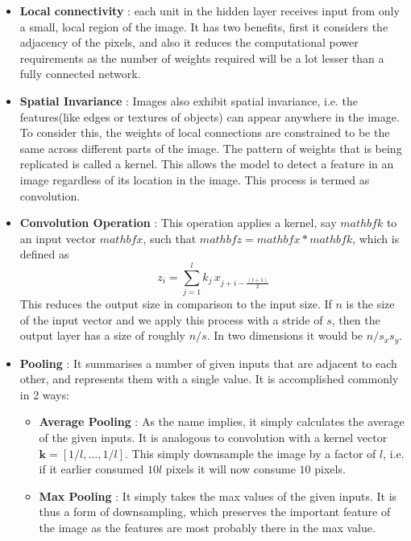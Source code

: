 \documentclass{article}
\begin{document}
  \begin{itemize}
    \item \textbf{Local connectivity} : each unit in the hidden layer receives input from only a small, local region of the image. It has two benefits, first it considers the adjacency of the pixels, and also it reduces the computational power requirements as the number of weights required will be a lot lesser than a fully connected network.
    \item \textbf{Spatial Invariance} : Images also exhibit spatial invariance, i.e. the features(like edges or textures of objects) can appear anywhere in the image. To consider this, the weights of local connections are constrained to be the same across different parts of the image. The pattern of weights that is being replicated is called a kernel. This allows the model to detect a feature in an image regardless of its location in the image. This process is termed as convolution.
    \item \textbf{Convolution Operation} : This operation applies a kernel, say $mathbf{k}$ to an input  vector $mathbf{x}$, such that $mathbf{z } =mathbf{x} * mathbf{k}$, which is defined as
      \begin{equation*}
        z_i = \sum_{j=1}^{l} k_j \, x_{j+i-\frac{(l+1)}{2}}
      \end{equation*}
      This reduces the output size in comparison to the input size. If $n$ is the size of the input vector and we apply this process with a stride of $s$, then the output layer has a size of roughly $n/s$. In two dimensions it would be $n/ s_x s_y$. 
    \item \textbf{Pooling} : It summarises a number of given inputs that are adjacent to each other, and represents them with a single value. It is accomplished commonly in 2 ways:
      \begin{itemize}
        \item \textbf{Average Pooling} : As the name implies, it simply calculates the average of the given inputs. It is analogous to convolution with a kernel vector $\mathbf{k} = [1/l,\ldots,1/l]$. This simply downsample the image by a factor of $l$, i.e. if it earlier consumed $10l$ pixels it will now consume $10$ pixels.
        \item \textbf{Max Pooling} : It simply takes the max values of the given inputs. It is thus a form of downsampling, which preserves the important feature of the image as the features are most probably there in the max value.
      \end{itemize}

\end{itemize}
\end{document}
